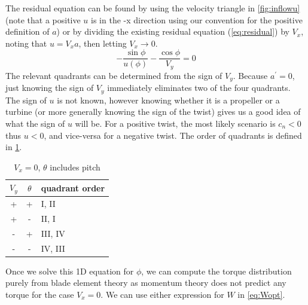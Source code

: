 \documentclass{article}
\begin{document}
The residual equation can be found by using the velocity triangle in \cref{fig:inflowu} (note that a positive $u$ is in the -x direction using our convention for the positive definition of $a$) or by dividing the existing residual equation (\cref{eq:residual}) by $V_x$, noting that $u = V_x a$, then letting $V_x \rightarrow 0$.
\begin{equation}
    - \frac{\sin\phi}{u(\phi)} - \frac{\cos\phi}{V_y} = 0
\end{equation}
The relevant quadrants can be determined from the sign of $V_y$.  Because $a^\prime = 0$, just knowing the sign of $V_y$ immediately eliminates two of the four quadrants.  The sign of $u$ is not known, however knowing whether it is a propeller or a turbine (or more generally knowing the sign of the twist) gives us a good idea of what the sign of $u$ will be.  For a positive twist, the most likely scenario is $c_n < 0$ thus $u < 0$, and vice-versa for a negative twist.  The order of quadrants is defined in \cref{tab:bracket2}.

\begin{table}[htb]
\centering
\caption{$V_x = 0$, $\theta$ includes pitch}
\label{tab:bracket2}
\begin{tabular}{@{}ccl@{}}
\toprule
$V_y$ & $\theta$ & quadrant order \\
\midrule
+ & + & I, II \\
+ & - & II, I \\
- & + & III, IV \\
- & - & IV, III \\
\bottomrule
\end{tabular}
\end{table}


Once we solve this 1D equation for $\phi$, we can compute the torque distribution purely from blade element theory as momentum theory does not predict any torque for the case $V_x = 0$. We can use either expression for $W$ in \cref{eq:Wopt}.

\end{document}
